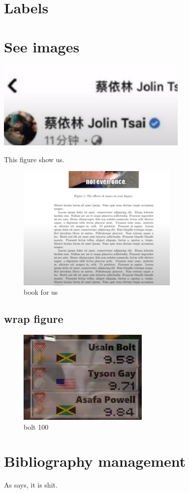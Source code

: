 \documentclass{article}
\begin{document}
\section{Labels}




\section{See images}
\begin{center}
    \includegraphics[width=0.7\textwidth,angle=90]{arch.png}
\end{center}

\blindtext
This figure show us.

\begin{figure}[h]
    \centering
    \includegraphics[width=0.7\textwidth,angle=90]{book.png}
    \caption{book for us}
\end{figure}

\blindtext

\blindtext

\blindtext

\subsection{wrap figure}

\blindtext
\begin{figure}
    \centering
    \includegraphics[width=2.5in]{bolt.png}
    \caption{bolt 100}
\end{figure}
\blindtext


\section{Bibliography management}

As \autocite{arbelaez2011contour} says, it is shit.  

% 
\printbibliography
\end{document}
